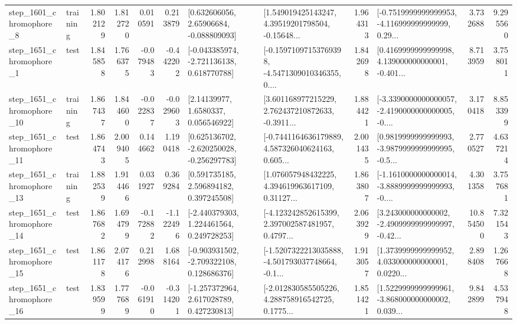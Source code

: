 \begin{tabular}{llrrrrllrlrr}
  step\_1601\_chromophore\_8 &  training &      1.802129 &    1.812720 &      0.010591 &  0.213879 &     [0.632606056, 2.65906684, -0.088809093] &  [1.549019425143247, 4.39519201798504, -0.15648... &       1.964313 &  [-0.7519999999999953, -4.116999999999999, 0.29... &            3.732688 &          9.295560 \\
  step\_1651\_chromophore\_1 &      test &      1.845858 &    1.766375 &     -0.079483 & -0.442202 &   [-0.043385974, -2.721136138, 0.618770788] &  [-0.15971097153769398, -4.5471309010346355, 0.... &       1.842698 &  [0.4169999999999998, 4.139000000000001, -0.401... &            8.713959 &          3.758011 \\
 step\_1651\_chromophore\_10 &  training &      1.867437 &    1.844600 &     -0.022837 & -0.029603 &        [2.14139977, 1.6580337, 0.056546922] &  [3.601168977215229, 2.762437210872633, -0.3911... &       1.884421 &  [-3.3390000000000057, -2.4190000000000005, -0.... &            3.170418 &          8.853399 \\
 step\_1651\_chromophore\_11 &      test &      1.864743 &    2.009405 &      0.144662 &  1.190418 &   [0.625136702, -2.620250028, -0.256297783] &  [-0.7441164636179889, 4.587326040624163, 0.605... &       2.001435 &  [0.9819999999999993, -3.9879999999999995, -0.5... &            2.770527 &          4.637214 \\
 step\_1651\_chromophore\_13 &  training &      1.882539 &    1.914466 &      0.031927 &  0.369284 &     [0.591735185, 2.596894182, 0.397245508] &  [1.076057948432225, 4.394619963617109, 0.31127... &       1.863807 &  [-1.1610000000000014, -3.8889999999999993, -0.... &            4.301358 &          3.757681 \\
 step\_1651\_chromophore\_14 &      test &      1.867682 &    1.694799 &     -0.172882 & -1.122496 &    [-2.440379303, 1.224461564, 0.249728253] &  [-4.123242852615399, 2.397002587481957, 0.4797... &       2.063929 &  [3.243000000000002, -2.4909999999999997, -0.42... &           10.854500 &          7.321543 \\
 step\_1651\_chromophore\_15 &      test &      1.861178 &    2.074176 &      0.212998 &  1.688164 &   [-0.903931502, -2.709322108, 0.128686376] &  [-1.5207322213035888, -4.501793037748664, -0.1... &       1.913057 &  [1.3739999999999952, 4.033000000000001, 0.0220... &            2.898408 &          1.267668 \\
 step\_1651\_chromophore\_16 &      test &      1.839599 &    1.777689 &     -0.061910 & -0.314201 &    [-1.257372964, 2.617028789, 0.427230813] &  [-2.012830585505226, 4.288758916542725, 0.1775... &       1.851421 &  [1.5229999999999961, -3.868000000000002, 0.039... &            9.842899 &          4.537948 \\

\end{tabular}
